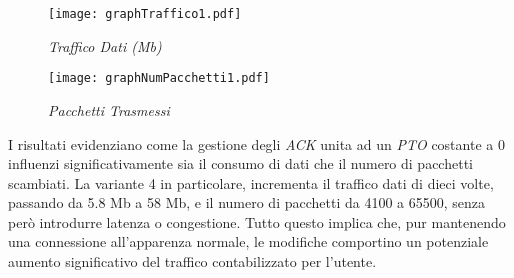 \begin{figure}[!h]
    \centering
    \begin{minipage}{0.48\textwidth}
        \centering
        \texttt{[image: graphTraffico1.pdf]}
        \caption{\emph{Traffico Dati (Mb)}}
        \label{grafico12}
    \end{minipage}
    \hfill
    \begin{minipage}{0.48\textwidth}
        \centering
        \texttt{[image: graphNumPacchetti1.pdf]}
        \caption{\emph{Pacchetti Trasmessi}}
        \label{grafico1}
    \end{minipage}
\end{figure}
\noindent I risultati evidenziano come la gestione degli \emph{ACK} unita ad un \emph{PTO} costante a 0 influenzi significativamente sia il consumo di dati che il numero di pacchetti scambiati.
La variante 4 in particolare, incrementa il traffico dati di dieci volte, passando da 5.8 Mb a 58 Mb, e il numero di pacchetti da 4100 a 65500, senza però introdurre latenza o congestione. 
Tutto questo implica che, pur mantenendo una connessione all'apparenza normale, le modifiche comportino un potenziale aumento significativo del traffico contabilizzato per l'utente.
